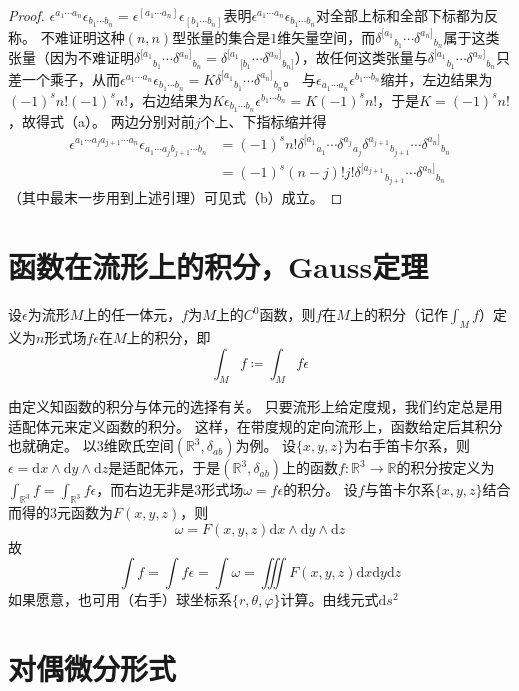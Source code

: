 \begin{proof}
    $\epsilon^{a_1 \cdots a_n}\epsilon_{b_1 \cdots b_n} = \epsilon^{[a_1 \cdots a_n]}\epsilon_{[b_1 \cdots b_n]}$表明$\epsilon^{a_1 \cdots a_n}\epsilon_{b_1 \cdots b_n}$对全部上标和全部下标都为反称。
    不难证明这种$(n, n)$型张量的集合是$1$维矢量空间，而$\delta^{[a_1}{}_{b_1} \cdots \delta^{a_n]}{}_{b_n}$属于这类张量（因为不难证明$\delta^{[a_1}{}_{b_1} \cdots \delta^{a_n]}{}_{b_n} = \delta^{[a_1}{}_{[b_1} \cdots \delta^{a_n]}{}_{b_n]}$），故任何这类张量与$\delta^{[a_1}{}_{b_1} \cdots \delta^{a_n]}{}_{b_n}$只差一个乘子，从而$\epsilon^{a_1 \cdots a_n}\epsilon_{b_1 \cdots b_n} = K\delta^{[a_1}{}_{b_1} \cdots \delta^{a_n]}{}_{b_n}$。
    与$\epsilon_{a_1 \cdots a_n}\epsilon^{b_1 \cdots b_n}$缩并，左边结果为$(-1)^sn!(-1)^sn!$，右边结果为$K\epsilon_{b_1 \cdots b_n}\epsilon^{b_1 \cdots b_n} = K(-1)^sn!$，于是$K = (-1)^sn!$，故得式（a）。
    两边分别对前$j$个上、下指标缩并得
    \[\begin{split}
        \epsilon^{a_1 \cdots a_j a_{j + 1} \cdots a_n}\epsilon_{a_1 \cdots a_j b_{j + 1} \cdots b_n} & = (-1)^sn!\delta^{[a_1}{}_{a_1} \cdots \delta^{a_j}{}_{a_j}\delta^{a_{j + 1}}{}_{b_{j + 1}} \cdots \delta^{a_n]}{}_{b_n} \\
        & = (-1)^s(n - j)!j!\delta^{[a_{j + 1}}{}_{b_{j + 1}} \cdots \delta^{a_n]}{}_{b_n}
    \end{split}\]
    （其中最末一步用到上述引理）可见式（b）成立。
\end{proof}

\section{函数在流形上的积分，Gauss定理}

\begin{definition}
    设$\epsilon$为流形$M$上的任一体元，$f$为$M$上的$C^0$函数，则$f$在$M$上的积分（记作$\displaystyle\int_Mf$）定义为$n$形式场$f\epsilon$在$M$上的积分，即
    $$\int_Mf \coloneq \int_Mf\epsilon$$
\end{definition}

由定义知函数的积分与体元的选择有关。
只要流形上给定度规，我们约定总是用适配体元来定义函数的积分。
这样，在带度规的定向流形上，函数给定后其积分也就确定。
以$3$维欧氏空间$(\mathbb{R}^3, \delta_{ab})$为例。
设$\{x, y, z\}$为右手笛卡尔系，则$\epsilon = \mathrm{d}x \wedge \mathrm{d}y \wedge \mathrm{d}z$是适配体元，于是$(\mathbb{R}^3, \delta_{ab})$上的函数$f \colon \mathbb{R}^3 \to \mathbb{R}$的积分按定义为$\displaystyle\int_{\mathbb{R}^3}f = \int_{\mathbb{R}^3}f\epsilon$，而右边无非是$3$形式场$\omega = f\epsilon$的积分。
设$f$与笛卡尔系$\{x, y, z\}$结合而得的$3$元函数为$F(x, y, z)$，则
$$\omega = F(x, y, z)\mathrm{d}x\wedge\mathrm{d}y\wedge\mathrm{d}z$$
故
$$\int f = \int f\epsilon = \int \omega = \iiint F(x, y, z) \mathrm{d}x\mathrm{d}y\mathrm{d}z$$
如果愿意，也可用（右手）球坐标系$\{r, \theta, \varphi\}$计算。由线元式$\mathrm{d}s^2$


\section{对偶微分形式}

